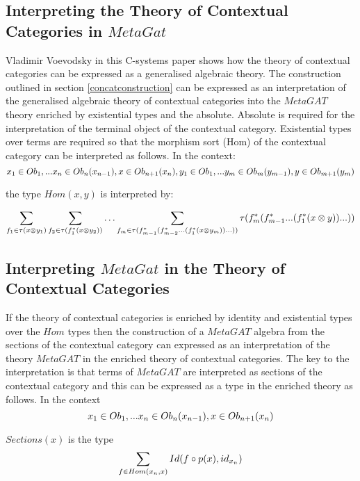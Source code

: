 \documentclass[10pt,a4paper]{scrartcl}
\begin{document}
\subsection {Interpreting the Theory of Contextual Categories in $MetaGat$}
\noindent Vladimir Voevodsky in this C-systems paper shows how the theory of contextual categories can be expressed as a generalised algebraic theory.
\noindent The construction outlined in section \ref{concatconstruction} can be expressed as an interpretation of the generalised algebraic theory of contextual categories into the $MetaGAT$ theory enriched by existential types and the absolute. Absolute is required for the interpretation of the terminal object of the contextual category. Existential types over terms are required so that the morphism sort (Hom) of the contextual category can be interpreted as follows.
In the context:
\begin{equation}
x_1 \in Ob_1,...x_n \in Ob_n(x_{n-1}),x \in Ob_{n+1}(x_n),y_1 \in Ob_1,...y_m \in Ob_{m}(y_{m-1}),y \in Ob_{m+1}(y_m)
\end{equation}

\noindent the type $Hom(x,y)$ is interpreted by:

\begin{equation}
\sum_{f_1 \in \tau(x \otimes y_1)}
\sum_{f_2 \in \tau(f_1 ^* (x \otimes y_2))}
\hdots
\sum_{f_m \in \tau(f_{m-1} ^* (f_{m-2}^*...(f_1 ^* (x \otimes y_m))...))}
\tau(f_{m} ^* (f_{m-1} ^* ...(f_1 ^* (x \otimes y))...))
\end{equation}

\subsection {Interpreting $MetaGat$ in the Theory of Contextual Categories}
\noindent If the theory of contextual categories is enriched by identity and existential types over the $Hom$ types then the construction of a $MetaGAT$ algebra from the sections of the contextual category can expressed as an interpretation of the theory $MetaGAT$ in the enriched theory of contextual categories. The key to the interpretation is that terms of $MetaGAT$ are interpreted as sections of the contextual category and this
can be expressed as a type in the enriched theory as follows.
\noindent In the context
\begin{displaymath}
x_1 \in Ob_1,...x_n \in Ob_n(x_{n-1}),x \in Ob_{n+1}(x_n)
\end{displaymath}

\noindent $Sections(x)$ is the type
\begin{displaymath}
\sum_{f \in Hom(x_n,x)}Id(f \circ p(x),id_{x_n})
\end{displaymath}


\end{document}
